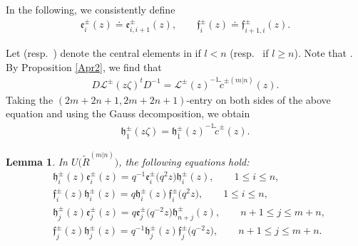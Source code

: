 \documentclass[10pt,a4paper]{amsart}
\numberwithin{equation}{section}
\newtheorem{Lemma}[Theorem]{Lemma}
\begin{document}
In the following, we consistently define
\begin{gather*}
 \mathfrak{e}_{i}^{\pm}(z)\doteq\mathfrak{e}_{i,i+1}^{\pm}(z), \qquad \mathfrak{f}_{i}^{\pm}(z)\doteq\mathfrak{f}_{i+1,i}^{\pm}(z).
\end{gather*}

Let  \big(resp.\ \big) denote the central elements in  if $l<n$ \big(resp.\  if $l\geq n$\big). Note that .
By Proposition \ref{Apr2}, we find that
\begin{gather*}%
 D\mathcal{L}^{\pm}(z\zeta)^tD^{-1}={\mathcal{L}^{\pm}(z)}^{-1}\widetilde{c}^{\pm(m|n)}(z).
\end{gather*}
Taking the $(2m+2n+1, 2m+2n+1)$-entry on both sides of the above equation and using the Gauss decomposition, we obtain
\begin{gather}\label{For2}
 \mathfrak{h}_1^{\pm}(z\zeta)={\mathfrak{h}_{\overline{1}}^{\pm}(z)}^{-1}\widetilde{c}^{\pm}(z).
\end{gather}

\begin{Lemma}\label{le3}
In $U\bigl(\widetilde{R}^{(m|n)}\bigr)$, the following equations hold:
\begin{align}
&\mathfrak{h}_i^{\pm}(z)\mathfrak{e}_i^{\pm}(z)=q^{-1}\mathfrak{e}_i^{\pm}\bigl(q^2z\bigr)\mathfrak{h}_i^{\pm}(z),\qquad 1\leq i\leq n,\label{For3} \\
&\mathfrak{f}_i^{\pm}(z)\mathfrak{h}_i^{\pm}(z)=q\mathfrak{h}_i^{\pm}(z)\mathfrak{f}_i^{\pm}\bigl(q^2z\bigr),\qquad 1\leq i\leq n, \nonumber\\
&\mathfrak{h}_{j}^{\pm}(z)\mathfrak{e}_{j}^{\pm}(z)=q\mathfrak{e}_{j}^{\pm}\bigl(q^{-2}z\bigr)\mathfrak{h}_{n+j}^{\pm}(z),\qquad n+1\leq j\leq m+n, \label{For4}\\
&\mathfrak{f}_{j}^{\pm}(z)\mathfrak{h}_{j}^{\pm}(z)=q^{-1}\mathfrak{h}_{j}^{\pm}(z) \mathfrak{f}_{j}^{\pm}\bigl(q^{-2}z\bigr),
\qquad n+1\leq j\leq m+n.\nonumber
\end{align}
\end{Lemma}
\end{document}
